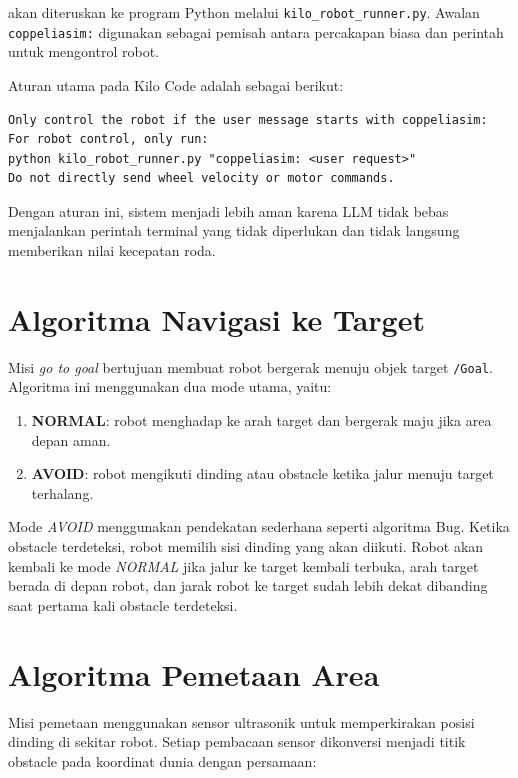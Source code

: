 \documentclass{article}
\begin{document}
akan diteruskan ke program Python melalui \texttt{kilo\_robot\_runner.py}. Awalan \texttt{coppeliasim:} digunakan sebagai pemisah antara percakapan biasa dan perintah untuk mengontrol robot.

Aturan utama pada Kilo Code adalah sebagai berikut:

\begin{lstlisting}[style=bashstyle]
Only control the robot if the user message starts with coppeliasim:
For robot control, only run:
python kilo_robot_runner.py "coppeliasim: <user request>"
Do not directly send wheel velocity or motor commands.
\end{lstlisting}

Dengan aturan ini, sistem menjadi lebih aman karena LLM tidak bebas menjalankan perintah terminal yang tidak diperlukan dan tidak langsung memberikan nilai kecepatan roda.

\section{Algoritma Navigasi ke Target}

Misi \textit{go to goal} bertujuan membuat robot bergerak menuju objek target \texttt{/Goal}. Algoritma ini menggunakan dua mode utama, yaitu:

\begin{enumerate}[itemsep=0.2em]
    \item \textbf{NORMAL}: robot menghadap ke arah target dan bergerak maju jika area depan aman.
    \item \textbf{AVOID}: robot mengikuti dinding atau obstacle ketika jalur menuju target terhalang.
\end{enumerate}

Mode \textit{AVOID} menggunakan pendekatan sederhana seperti algoritma Bug. Ketika obstacle terdeteksi, robot memilih sisi dinding yang akan diikuti. Robot akan kembali ke mode \textit{NORMAL} jika jalur ke target kembali terbuka, arah target berada di depan robot, dan jarak robot ke target sudah lebih dekat dibanding saat pertama kali obstacle terdeteksi.

\section{Algoritma Pemetaan Area}

Misi pemetaan menggunakan sensor ultrasonik untuk memperkirakan posisi dinding di sekitar robot. Setiap pembacaan sensor dikonversi menjadi titik obstacle pada koordinat dunia dengan persamaan:
\end{document}
